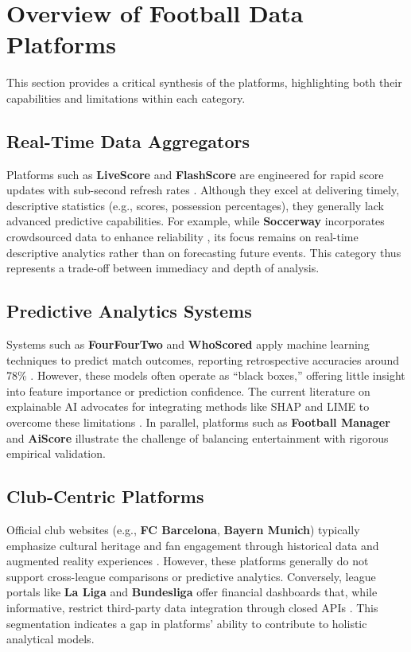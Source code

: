 \section{Overview of Football Data Platforms}
This section provides a critical synthesis of the platforms, highlighting both their capabilities and limitations within each category.

\subsection{Real-Time Data Aggregators}
Platforms such as \textbf{LiveScore} and \textbf{FlashScore} are engineered for rapid score updates with sub-second refresh rates \cite{livescore, flashscore}. Although they excel at delivering timely, descriptive statistics (e.g., scores, possession percentages), they generally lack advanced predictive capabilities. For example, while \textbf{Soccerway} incorporates crowdsourced data to enhance reliability \cite{soccerway}, its focus remains on real-time descriptive analytics rather than on forecasting future events. This category thus represents a trade-off between immediacy and depth of analysis.

\subsection{Predictive Analytics Systems}
Systems such as \textbf{FourFourTwo} and \textbf{WhoScored} apply machine learning techniques to predict match outcomes, reporting retrospective accuracies around 78\% \cite{442, whoscored}. However, these models often operate as ``black boxes,'' offering little insight into feature importance or prediction confidence. The current literature on explainable AI advocates for integrating methods like SHAP and LIME to overcome these limitations \cite{explainableAI}. In parallel, platforms such as \textbf{Football Manager} and \textbf{AiScore} illustrate the challenge of balancing entertainment with rigorous empirical validation.

\subsection{Club-Centric Platforms}
Official club websites (e.g., \textbf{FC Barcelona}, \textbf{Bayern Munich}) typically emphasize cultural heritage and fan engagement through historical data and augmented reality experiences \cite{fcb, bayern}. However, these platforms generally do not support cross-league comparisons or predictive analytics. Conversely, league portals like \textbf{La Liga} and \textbf{Bundesliga} offer financial dashboards that, while informative, restrict third-party data integration through closed APIs \cite{laliga, bundesliga}. This segmentation indicates a gap in platforms’ ability to contribute to holistic analytical models.

